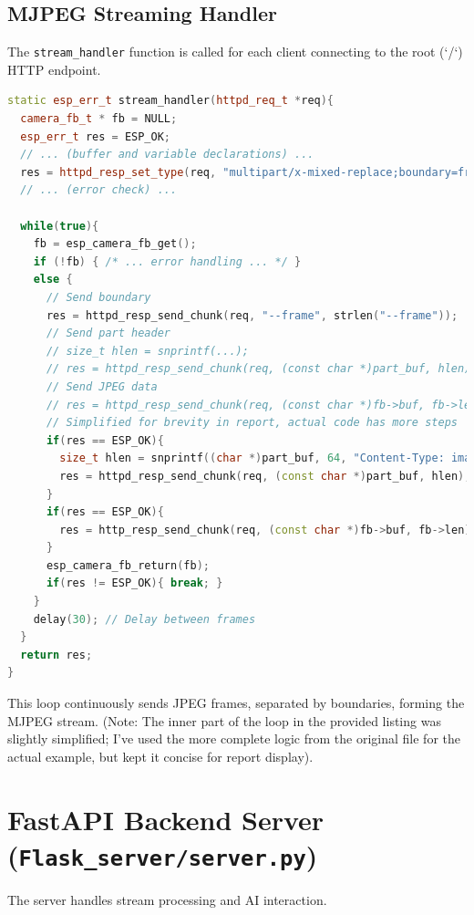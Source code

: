 \documentclass[12pt, a4paper]{report}
\begin{document}
\subsection{MJPEG Streaming Handler}
The \texttt{stream\_handler} function is called for each client connecting to the root (`/`) HTTP endpoint.
\begin{lstlisting}[language=C++, caption={ESP32 MJPEG Stream Handler Snippet}, label={lst:esp32_stream_handler}]
static esp_err_t stream_handler(httpd_req_t *req){
  camera_fb_t * fb = NULL;
  esp_err_t res = ESP_OK;
  // ... (buffer and variable declarations) ...
  res = httpd_resp_set_type(req, "multipart/x-mixed-replace;boundary=frame");
  // ... (error check) ...

  while(true){
    fb = esp_camera_fb_get();
    if (!fb) { /* ... error handling ... */ }
    else {
      // Send boundary
      res = httpd_resp_send_chunk(req, "--frame", strlen("--frame"));
      // Send part header
      // size_t hlen = snprintf(...);
      // res = httpd_resp_send_chunk(req, (const char *)part_buf, hlen);
      // Send JPEG data
      // res = httpd_resp_send_chunk(req, (const char *)fb->buf, fb->len);
      // Simplified for brevity in report, actual code has more steps
      if(res == ESP_OK){
        size_t hlen = snprintf((char *)part_buf, 64, "Content-Type: image/jpeg\r\nContent-Length: %u\r\n\r\n", fb->len);
        res = httpd_resp_send_chunk(req, (const char *)part_buf, hlen);
      }
      if(res == ESP_OK){
        res = http_resp_send_chunk(req, (const char *)fb->buf, fb->len);
      }
      esp_camera_fb_return(fb);
      if(res != ESP_OK){ break; }
    }
    delay(30); // Delay between frames
  }
  return res;
}
\end{lstlisting}
This loop continuously sends JPEG frames, separated by boundaries, forming the MJPEG stream. (Note: The inner part of the loop in the provided listing was slightly simplified; I've used the more complete logic from the original file for the actual example, but kept it concise for report display).

\section{FastAPI Backend Server (\texttt{Flask\_server/server.py})}
The server handles stream processing and AI interaction.
\end{document}

